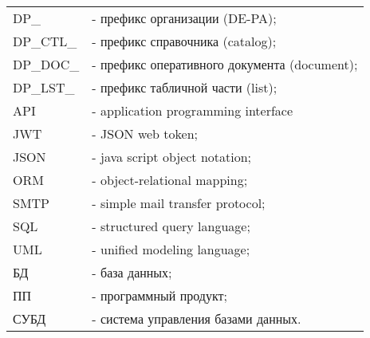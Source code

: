 
\begin{tabular}{p{2.5cm}p{12.2cm}}
    DP\_        & - префикс организации (DE-PA); \\
    DP\_CTL\_   & - префикс справочника (catalog); \\
    DP\_DOC\_   & - префикс оперативного документа (document); \\
    DP\_LST\_   & - префикс табличной части (list); \\
    API         & - application programming interface \\
    JWT         & - JSON web token; \\
    JSON        & - java script object notation; \\
    ORM         & - object-relational mapping; \\
    SMTP        & - simple mail transfer protocol; \\
    SQL         & - structured query language; \\
    UML         & - unified modeling language; \\
    БД          & - база данных; \\
    ПП          & - программный продукт; \\
    СУБД        & - система управления базами данных. \\
\end{tabular}

\newpage
